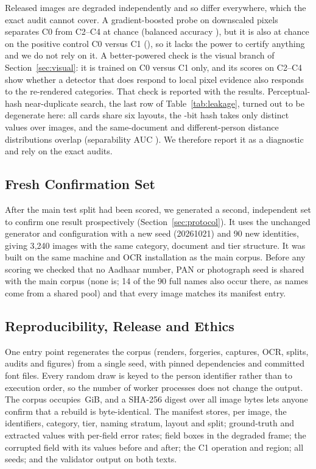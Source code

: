 \documentclass[VANCOUVER,Times1COL]{WileyNJDv5}
\begin{document}
Released images are degraded independently and so differ everywhere,
which the exact audit cannot cover. A gradient-boosted probe on
downscaled pixels separates C0 from C2--C4 at chance (balanced accuracy
\dsProbeCritical), but it is also at chance on the positive control C0
versus C1 (\dsProbeControl), so it lacks the power to certify anything
and we do not rely on it. A better-powered check is the visual branch
of Section~\ref{sec:visual}: it is trained on C0 versus C1 only, and its
scores on C2--C4 show whether a detector that does respond to local
pixel evidence also responds to the re-rendered categories. That check
is reported with the results. Perceptual-hash near-duplicate search, the
last row of Table~\ref{tab:leakage}, turned out to be degenerate here:
all cards share six layouts, the \dsPhashBits-bit hash takes only
\dsPhashDistinct{} distinct values over \dsImages{} images, and the
same-document and different-person distance distributions overlap
(separability AUC \dsPhashAUC). We therefore report it as a diagnostic
and rely on the exact audits.

\subsection{Fresh Confirmation Set}
\label{subsec:fresh}

After the main test split had been scored, we generated a second,
independent set to confirm one result prospectively
(Section~\ref{sec:protocol}). It uses the unchanged generator and
configuration with a new seed (20261021) and 90 new identities, giving
3{,}240 images with the same category, document and tier structure. It
was built on the same machine and OCR installation as the main corpus.
Before any scoring we checked that no Aadhaar number, PAN or photograph
seed is shared with the main corpus (none is; 14 of the 90 full names
also occur there, as names come from a shared pool) and that every
image matches its manifest entry.

\subsection{Reproducibility, Release and Ethics}
\label{subsec:release}
\label{subsec:ethics}

One entry point regenerates the corpus (renders, forgeries, captures,
OCR, splits, audits and figures) from a single seed, with pinned
dependencies and committed font files. Every random draw is keyed to
the person identifier rather than to execution order, so the number of
worker processes does not change the output. The corpus occupies
\dsGiB\,GiB, and a SHA-256 digest over all image bytes lets anyone
confirm that a rebuild is byte-identical. The manifest stores, per
image, the identifiers, category, tier, naming stratum, layout and
split; ground-truth and extracted values with per-field error rates;
field boxes in the degraded frame; the corrupted field with its values
before and after; the C1 operation and region; all seeds; and the
validator output on both texts.
\end{document}
